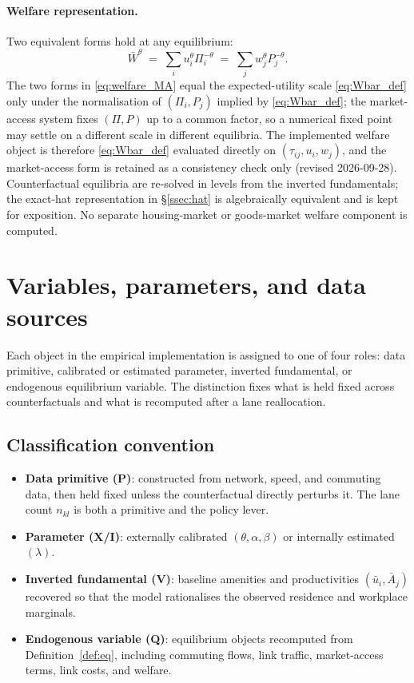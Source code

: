 \documentclass[12pt]{article}
\newcommand{\Wbar}{\bar W}
\newcommand{\ubar}{\bar u}
\newcommand{\Abar}{\bar A}
\begin{document}
\paragraph{Welfare representation.}
Two equivalent forms hold at any equilibrium:
\begin{equation}
  \Wbar^{\theta}
  \;=\;\sum_i u_i^{\theta}\Pi_i^{-\theta}
  \;=\;\sum_j w_j^{\theta}P_j^{-\theta}.
  \label{eq:welfare_MA}
\end{equation}
The two forms in \eqref{eq:welfare_MA} equal the expected-utility
scale \eqref{eq:Wbar_def} only under the normalisation of $(\Pi_i,P_j)$
implied by \eqref{eq:Wbar_def}; the market-access system fixes
$(\Pi,P)$ up to a common factor, so a numerical fixed point may settle on
a different scale in different equilibria. The implemented welfare object
is therefore \eqref{eq:Wbar_def} evaluated directly on
$(\tau_{ij},u_i,w_j)$, and the market-access form is retained as a
consistency check only (revised 2026-09-28). Counterfactual equilibria
are re-solved in levels from the inverted fundamentals; the exact-hat
representation in \S\ref{ssec:hat} is algebraically equivalent and is
kept for exposition. No separate housing-market or goods-market welfare
component is computed.

\section{Variables, parameters, and data sources}\label{sec:inventory}

Each object in the empirical implementation is assigned to one of
four roles: data primitive, calibrated or estimated parameter,
inverted fundamental, or endogenous equilibrium variable.  The
distinction fixes what is held fixed across counterfactuals and what
is recomputed after a lane reallocation.

\subsection{Classification convention}\label{ssec:classification}

\begin{itemize}[leftmargin=2em,itemsep=0.2em]
\item \textbf{Data primitive (P)}: constructed from network, speed,
  and commuting data, then held fixed unless the counterfactual
  directly perturbs it.  The lane count $n_{kl}$ is both a primitive
  and the policy lever.
\item \textbf{Parameter (X/I)}: externally calibrated
  $(\theta,\alpha,\beta)$ or internally estimated $(\lambda)$.
\item \textbf{Inverted fundamental (V)}: baseline amenities and
  productivities $(\ubar_i,\Abar_j)$ recovered so that the model
  rationalises the observed residence and workplace marginals.
\item \textbf{Endogenous variable (Q)}: equilibrium objects
  recomputed from Definition~\ref{def:eq}, including commuting
  flows, link traffic, market-access terms, link costs, and welfare.
\end{itemize}
\end{document}
